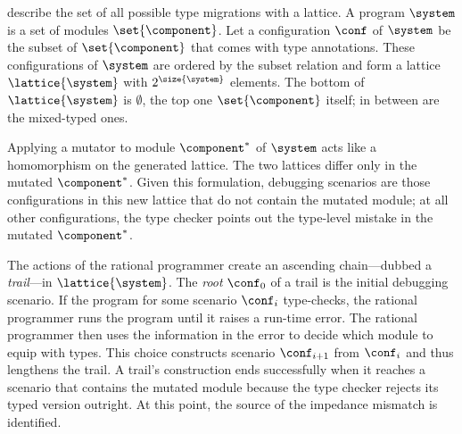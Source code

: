 
\citet{tfgnvf-popl-2016} describe the set of all possible type migrations with a
lattice. A program $\system$ is a set of modules $\set{\component}$.
Let a configuration $\conf$ of $\system$ be the subset of $\set{\component}$
that comes with type annotations. These configurations of $\system$ are ordered
by the subset relation and form a lattice $\lattice{\system}$ with
$2^{\size{\system}}$ elements. The bottom of $\lattice{\system}$ is
$\emptyset$, the top one $\set{\component}$ itself; in between are the mixed-typed ones.

Applying a mutator to module $\component^*$ of $\system$ acts like a homomorphism
on the generated lattice. The two lattices differ only in the mutated
$\component^*$. Given this formulation, debugging scenarios are those configurations in
this new lattice that do not contain the mutated module; at all other configurations, the type
checker points out the type-level mistake in the mutated $\component^*$.

The actions of the rational programmer create an ascending chain---dubbed a
\emph{trail}---in $\lattice{\system}$.  The {\em root\/} $\conf_0$ of a trail is
the initial debugging scenario. If the program for some scenario  $\conf_i$ type-checks,
the rational programmer runs the program until it raises a run-time error.  The
rational programmer then uses the information in the error to decide which module to
equip with types. This choice constructs scenario $\conf_{i+1}$ from $\conf_{i}$
and thus lengthens the trail. A trail's construction ends successfully when it reaches a
scenario that contains the mutated module because the type checker rejects its
typed version outright.  At this point, the source of the impedance mismatch is
identified.
